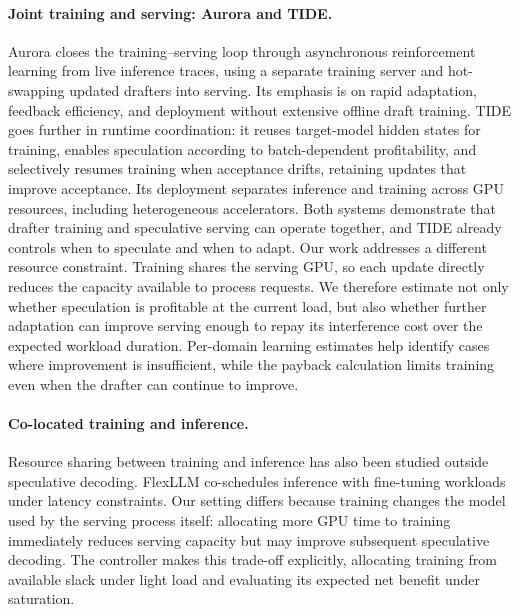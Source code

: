 \paragraph{Joint training and serving: Aurora and TIDE.}
Aurora \citep{wang2026aurora} closes the training--serving loop through asynchronous reinforcement learning from live inference traces, using a separate training server and hot-swapping updated drafters into serving. Its emphasis is on rapid adaptation, feedback efficiency, and deployment without extensive offline draft training. TIDE \citep{park2026tide} goes further in runtime coordination: it reuses target-model hidden states for training, enables speculation according to batch-dependent profitability, and selectively resumes training when acceptance drifts, retaining updates that improve acceptance. Its deployment separates inference and training across GPU resources, including heterogeneous accelerators. Both systems demonstrate that drafter training and speculative serving can operate together, and TIDE already controls when to speculate and when to adapt. Our work addresses a different resource constraint. Training shares the serving GPU, so each update directly reduces the capacity available to process requests. We therefore estimate not only whether speculation is profitable at the current load, but also whether further adaptation can improve serving enough to repay its interference cost over the expected workload duration. Per-domain learning estimates help identify cases where improvement is insufficient, while the payback calculation limits training even when the drafter can continue to improve.

\paragraph{Co-located training and inference.}
Resource sharing between training and inference has also been studied outside speculative decoding. FlexLLM \citep{oliaro2024flexllm} co-schedules inference with fine-tuning workloads under latency constraints. Our setting differs because training changes the model used by the serving process itself: allocating more GPU time to training immediately reduces serving capacity but may improve subsequent speculative decoding. The controller makes this trade-off explicitly, allocating training from available slack under light load and evaluating its expected net benefit under saturation.
